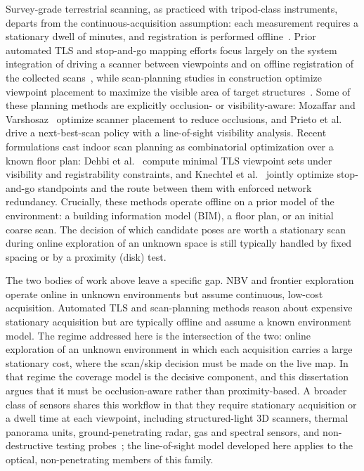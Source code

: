 Survey-grade terrestrial scanning, as practiced with tripod-class instruments,
departs from the continuous-acquisition assumption: each measurement requires a
stationary dwell of minutes, and registration is performed
offline~\cite{stopandgo-review}. Prior automated TLS and stop-and-go mapping
efforts focus largely on the system integration of driving a scanner between
viewpoints and on offline registration of the collected
scans~\cite{stopandgo-registration}, while scan-planning studies in
construction optimize viewpoint placement to maximize the visible area of
target structures~\cite{tls-scanplanning}. Some of these planning methods are
explicitly occlusion- or visibility-aware: Mozaffar and
Varshosaz~\cite{mozaffar2016occlusion} optimize scanner placement to reduce
occlusions, and Prieto et al.~\cite{prieto2017nbs} drive a next-best-scan
policy with a line-of-sight visibility analysis. Recent formulations cast
indoor scan planning as combinatorial optimization over a known floor plan:
Dehbi et al.~\cite{dehbi2021} compute minimal TLS viewpoint sets under
visibility and registrability constraints, and Knechtel et
al.~\cite{knechtel2025} jointly optimize stop-and-go standpoints and the route
between them with enforced network redundancy. Crucially, these methods operate
offline on a prior model of the environment: a building information model
(BIM), a floor plan, or an initial coarse scan. The decision of which
candidate poses are worth a stationary scan during online exploration of an
unknown space is still typically handled by fixed spacing or by a proximity
(disk) test.

The two bodies of work above leave a specific gap. NBV and frontier
exploration operate online in unknown environments but assume continuous,
low-cost acquisition. Automated TLS and scan-planning methods reason about
expensive stationary acquisition but are typically offline and assume a known
environment model. The regime addressed here is the intersection of the two:
online exploration of an unknown environment in which each acquisition carries
a large stationary cost, where the scan/skip decision must be made on the live
map. In that regime the coverage model is the decisive component, and this
dissertation argues that it must be occlusion-aware rather than proximity-based.
A broader class of sensors shares this workflow in that they require stationary
acquisition or a dwell time at each viewpoint, including structured-light 3D
scanners, thermal panorama units, ground-penetrating radar, gas and spectral
sensors, and non-destructive testing probes~\cite{gas-coverage,robotic-ndt};
the line-of-sight model developed here applies to the optical, non-penetrating
members of this family.

